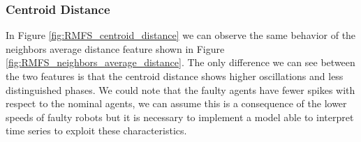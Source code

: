\documentclass[../../Thesis.tex]{subfiles}
\begin{document}
			\subsubsection{Centroid Distance}
				In Figure \ref{fig:RMFS_centroid_distance} we can observe the same behavior of the neighbors average distance feature shown in Figure \ref{fig:RMFS_neighbors_average_distance}. The only difference we can see between the two features is that the centroid distance shows higher oscillations and less distinguished phases. We could note that the faulty agents have fewer spikes with respect to the nominal agents, we can assume this is a consequence of the lower speeds of faulty robots but it is necessary to implement a model able to interpret time series to exploit these characteristics.
				\begin{figure}
					\centering
					\quad
\end{figure}
\end{document}
